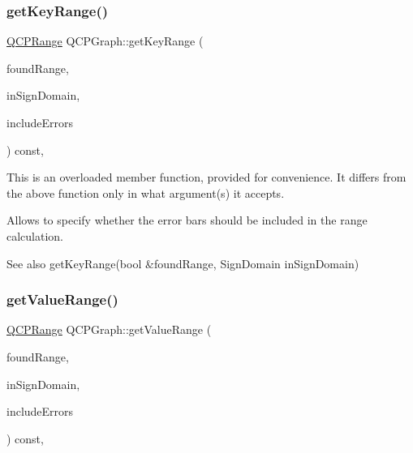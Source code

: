 \subsubsection{\texorpdfstring{get\+Key\+Range()}{getKeyRange()}}
{\footnotesize\ttfamily \mbox{\hyperlink{class_q_c_p_range}{Q\+C\+P\+Range}} Q\+C\+P\+Graph\+::get\+Key\+Range (\begin{DoxyParamCaption}\item[{bool \&}]{found\+Range,  }\item[{\mbox{\hyperlink{class_q_c_p_abstract_plottable_a661743478a1d3c09d28ec2711d7653d8}{Sign\+Domain}}}]{in\+Sign\+Domain,  }\item[{bool}]{include\+Errors }\end{DoxyParamCaption}) const\hspace{0.3cm}{\ttfamily [protected]}, {\ttfamily [virtual]}}

This is an overloaded member function, provided for convenience. It differs from the above function only in what argument(s) it accepts.

Allows to specify whether the error bars should be included in the range calculation.

\begin{DoxySeeAlso}{See also}
get\+Key\+Range(bool \&found\+Range, Sign\+Domain in\+Sign\+Domain) 
\end{DoxySeeAlso}
\mbox{\label{class_q_c_p_graph_ac23c7702ca836c7055f48e6fc3295ca4}} 
\subsubsection{\texorpdfstring{get\+Value\+Range()}{getValueRange()}}
{\footnotesize\ttfamily \mbox{\hyperlink{class_q_c_p_range}{Q\+C\+P\+Range}} Q\+C\+P\+Graph\+::get\+Value\+Range (\begin{DoxyParamCaption}\item[{bool \&}]{found\+Range,  }\item[{\mbox{\hyperlink{class_q_c_p_abstract_plottable_a661743478a1d3c09d28ec2711d7653d8}{Sign\+Domain}}}]{in\+Sign\+Domain,  }\item[{bool}]{include\+Errors }\end{DoxyParamCaption}) const\hspace{0.3cm}{\ttfamily [protected]}, {\ttfamily [virtual]}}

